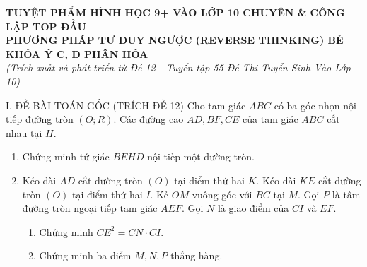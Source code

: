 \documentclass[11pt,a4paper]{article}
\begin{document}
\begin{center}
    {\Large\bfseries\color{blue!80!black} TUYỆT PHẨM HÌNH HỌC 9+ VÀO LỚP 10 CHUYÊN \& CÔNG LẬP TOP ĐẦU}\\[2mm]
    {\large\bfseries PHƯƠNG PHÁP TƯ DUY NGƯỢC (REVERSE THINKING) BẺ KHÓA Ý C, D PHÂN HÓA}\\[1mm]
    \textit{(Trích xuất và phát triển từ Đề 12 - Tuyển tập 55 Đề Thi Tuyển Sinh Vào Lớp 10)}
\end{center}

\vspace{1mm}

\begin{modelbox}{I. ĐỀ BÀI TOÁN GỐC (TRÍCH ĐỀ 12)}
Cho tam giác $ABC$ có ba góc nhọn nội tiếp đường tròn $(O; R)$. Các đường cao $AD, BF, CE$ của tam giác $ABC$ cắt nhau tại $H$.
\begin{enumerate}[label=\textbf{\alph*)}]
    \item Chứng minh tứ giác $BEHD$ nội tiếp một đường tròn.
    \item Kéo dài $AD$ cắt đường tròn $(O)$ tại điểm thứ hai $K$. Kéo dài $KE$ cắt đường tròn $(O)$ tại điểm thứ hai $I$. Kẻ $OM$ vuông góc với $BC$ tại $M$. Gọi $P$ là tâm đường tròn ngoại tiếp tam giác $AEF$. Gọi $N$ là giao điểm của $CI$ và $EF$.
    \begin{enumerate}[label=\textbf{\arabic*)}]
        \item Chứng minh $CE^2 = CN \cdot CI$.
        \item Chứng minh ba điểm $M, N, P$ thẳng hàng.
    \end{enumerate}
\end{enumerate}
\end{modelbox}

\vspace{2mm}
\end{document}
